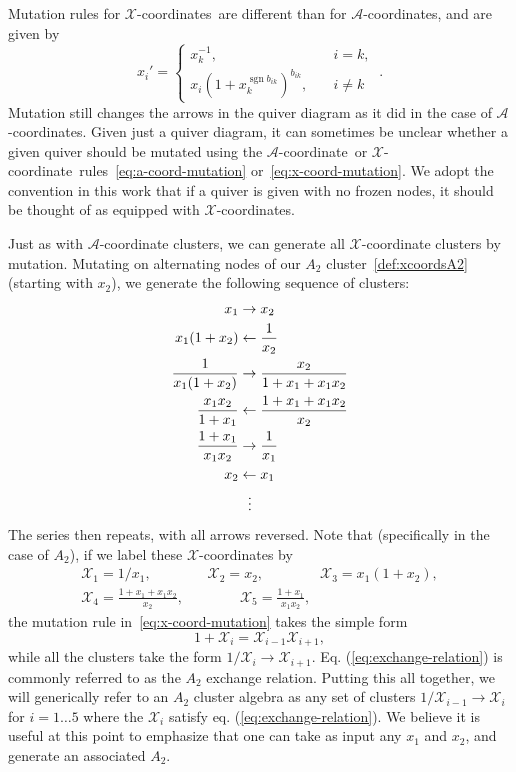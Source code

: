 \documentclass[12pt]{article}
\DeclareMathOperator{\sgn}{sgn}
\def\nl{\nonumber\\}
\def\nn{\nonumber}
\def\x{\mathcal{X}}
\def\xcoord{$\mathcal{X}$-coordinate}
\def\xcoords{$\mathcal{X}$-coordinates}
\def\a{\mathcal{A}}
\def\acoord{$\mathcal{A}$-coordinate}
\def\acoords{$\mathcal{A}$-coordinates}
\begin{document}
Mutation rules for \xcoords\ are different than for \acoords, and are given by
\begin{equation}
  \label{eq:x-coord-mutation}
  x_{i}' =
  \begin{cases}
    x_{k}^{-1}, &\quad i=k,\\
    x_{i} (1+x_{k}^{\sgn b_{i k}})^{b_{i k}}, &\quad i \neq k
  \end{cases}\ .
\end{equation}
Mutation still changes the arrows in the quiver diagram as it did in the case of \acoords.  Given just a quiver diagram, it can sometimes be unclear whether a given quiver should be mutated using the \acoord\ or \xcoord\ rules~\eqref{eq:a-coord-mutation} or~\eqref{eq:x-coord-mutation}. We adopt the convention in this work that if a quiver is given with no frozen nodes, it should be thought of as equipped with \xcoords.

Just as with $\a$-coordinate clusters, we can generate all $\x$-coordinate clusters by mutation. Mutating on alternating nodes of our $A_2$ cluster~\eqref{def:xcoordsA2} (starting with $x_2$), we generate the following sequence of clusters:
\begin{align}
  x_1 &\to \color{black}{x_2} \nl
  \color{black}{x_1(1+x_2)} &\leftarrow \frac{1}{x_2} \nl
  \frac{1}{x_1(1+x_2)} &\to \color{black}{\frac{x_2}{1+x_1+x_1 x_2}} \\
  \color{black}{\frac{x_1 x_2}{1+x_1}} &\leftarrow \frac{1+x_1+x_1 x_2}{x_2} \nl
  \frac{1+x_1}{x_1 x_2} &\to \color{black}{\frac{1}{x_1}} \nl
  \color{black}{x_2} &\leftarrow x_1 \nl
  &\ \ \vdots \nn
\end{align}
The series then repeats, with all arrows reversed. Note that (specifically in the case of $A_2$), if we label these $\x$-coordinates by
\begin{gather}\label{def:a2-xcoords}
  \x_1 = 1/x_1, \qquad \qquad \x_2 = x_2, \qquad \qquad \x_3 = x_1(1+x_2), \\ 
  \x_4 = \frac{1+x_1+x_1 x_2}{x_2}, \qquad \qquad \x_5 = \frac{1+x_1}{x_1 x_2}, \nonumber
\end{gather}
the mutation rule in~\eqref{eq:x-coord-mutation} takes the simple form
\begin{equation}\label{eq:exchange-relation}
  1+\x_i = \x_{i-1}\x_{i+1},
\end{equation}
while all the clusters take the form $1/\x_i \to \x_{i+1}$. Eq. (\ref{eq:exchange-relation}) is commonly referred to as the $A_2$ exchange relation. 
Putting this all together, we will generically refer to an $A_2$ cluster algebra as any set of clusters $1/\x_{i-1} \to \x_i$ for $i=1\ldots5$ where the $\x_i$ satisfy eq. (\ref{eq:exchange-relation}). We believe it is useful at this point to emphasize that one can take as input any $x_1$ and $x_2$, and generate an associated $A_2$. 
\end{document}
